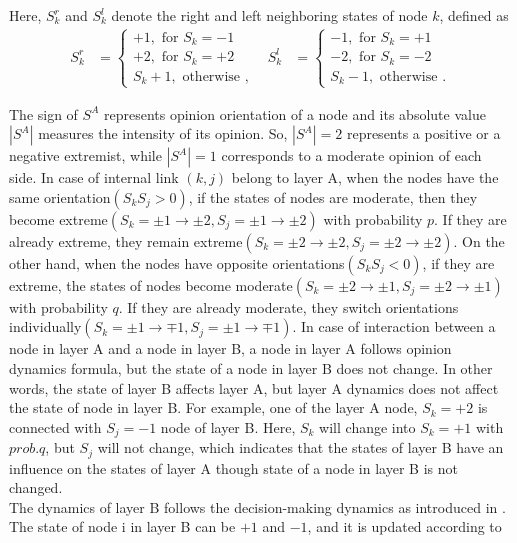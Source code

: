 Here, $S_k^r$ and $S_k^l$ denote the right and left neighboring states of node $k$, defined as
\begin{align}
S_k^r &= \left\{\begin{matrix}
+1,\mbox{ for } S_k = -1\\
+2,\mbox{ for } S_k = +2\\ 
S_k + 1,\mbox{ otherwise }, 
\end{matrix}\right. &
S_k^l &= \left\{\begin{matrix}
-1,\mbox{ for } S_k= +1
\\ -2,\mbox{ for } S_k=-2
\\ S_k - 1,\mbox{ otherwise }.
\end{matrix}\right.
\end{align}

The sign of $S^A$ represents opinion orientation of a node and its absolute value $|S^A|$ measures the intensity of its opinion. So, $|S^A|=2$ represents a positive or a negative extremist, while  $|S^A|=1$ corresponds to a moderate opinion of each side. In case of internal link $(k, j)$ belong to layer A, when the nodes have the same orientation$(S_kS_j>0)$, if the states of nodes are moderate, then they become extreme$(S_k=\pm1 \rightarrow \pm2, S_j= \pm1 \rightarrow \pm2)$ with probability $p$. If they are already extreme, they remain extreme$(S_k=\pm2 \rightarrow \pm2, S_j= \pm2 \rightarrow \pm2)$. On the other hand, when the nodes have opposite orientations$(S_kS_j<0)$, if they are extreme, the states of nodes become moderate$(S_k=\pm2 \rightarrow \pm1, S_j= \pm2 \rightarrow \pm1)$ with probability $q$. If they are already moderate, they switch orientations individually$(S_k=\pm1 \rightarrow \mp1, S_j= \pm1 \rightarrow \mp1)$.  In case of interaction between a node in layer A and a node in layer B, a node in layer A follows opinion dynamics formula, but the state of a node in layer B does not change. In other words, the state of layer B affects layer A, but layer A dynamics does not affect the state of node in layer B. For example, one of the layer A node, $S_k = +2$ is connected with  $S_j = -1$ node of layer B. Here, $S_k$ will change into $S_k = +1$ with $prob.q$, but $S_j$ will not change, which indicates that the states of layer B have an influence on the states of layer A though state of a node in layer B is not changed.\\

The dynamics of layer B follows the decision-making dynamics as introduced in \parencite{abrams2003, vazquez2010}. The state of node i in layer B can be $+1$ and $-1$, and it is updated according to

